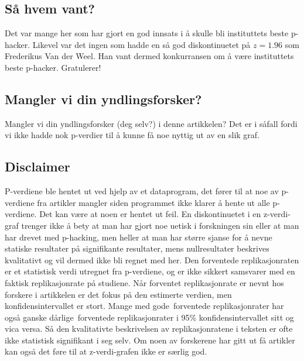 \documentclass[doc,norsk]{apa7}
\begin{document}
\subsection{Så hvem vant?}
Det var mange her som har gjort en god innsats i å skulle bli instituttets beste p-hacker. Likevel var det ingen som hadde en så god diskontinuetet på $z=1.96$ som Frederikus Van der Weel. Han vant dermed konkurransen om å være instituttets beste p-hacker. Gratulerer!

\subsection{Mangler vi din yndlingsforsker?}

Mangler vi din yndlingsforsker (deg selv?) i denne artikkelen? Det er i såfall fordi vi ikke hadde nok p-verdier til å kunne få noe nyttig ut av en slik graf.

\subsection{Disclaimer}
P-verdiene ble hentet ut ved hjelp av et dataprogram, det fører til at noe av p-verdiene fra artikler mangler siden programmet ikke klarer å hente ut alle p-verdiene. Det kan være at noen er hentet ut feil. En diskontinuetet i en z-verdi-graf trenger ikke å bety at man har gjort noe uetisk i forskningen sin eller at man har drevet med p-hacking, men heller at man har større sjanse for å nevne statiske resultater på signifikante resultater, mens nullresultater beskrives kvalitativt og vil dermed ikke bli regnet med her. Den forventede replikasjonraten er et statistisk verdi utregnet fra p-verdiene, og er ikke sikkert samsvarer med en faktisk replikasjonrate på studiene. Når forventet replikasjonrate er nevnt hos forskere i artikkelen er det fokus på den estimerte verdien, men konfidensintervallet er stort. Mange med \guillemetleft gode\guillemetright\ forventede replikasjonrater har også ganske \guillemetleft dårlige\guillemetright\ forventede replikasjonrater i 95\% konfidensintervallet sitt og vica versa. Så den kvalitativte beskrivelsen av replikasjonratene i teksten er ofte ikke statistisk signifikant i seg selv. Om noen av forskerene har gitt ut få artikler kan også det føre til at z-verdi-grafen ikke er særlig god.

\printbibliography
\end{document}
